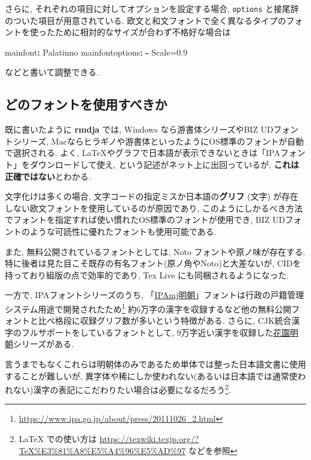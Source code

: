 \documentclass[
  xelatex,ja=standard,jafont=noto]{bxjsbook}
\newenvironment{Shaded}{\begin{snugshade}}{\end{snugshade}}
\newcommand{\AttributeTok}[1]{\textcolor[rgb]{0.77,0.63,0.00}{#1}}
\newcommand{\FunctionTok}[1]{\textcolor[rgb]{0.00,0.00,0.00}{#1}}
\newcommand{\KeywordTok}[1]{\textcolor[rgb]{0.13,0.29,0.53}{\textbf{#1}}}
\theoremstyle{definition}
\theoremstyle{definition}
\theoremstyle{definition}
\theoremstyle{definition}
\theoremstyle{remark}
\begin{document}
さらに, それぞれの項目に対してオプションを設定する場合, \texttt{options}
と接尾辞のついた項目が用意されている.
欧文と和文フォントで全く異なるタイプのフォントを使ったために相対的なサイズが合わず不格好な場合は

\begin{Shaded}
\begin{Highlighting}[]
\FunctionTok{mainfont}\KeywordTok{:}\AttributeTok{ Palatinno}
\FunctionTok{mainfontoptions}\KeywordTok{:}
\AttributeTok{  }\KeywordTok{{-}}\AttributeTok{ Scale=0.9}
\end{Highlighting}
\end{Shaded}

などと書いて調整できる.

\hypertarget{ux3069ux306eux30d5ux30a9ux30f3ux30c8ux3092ux4f7fux7528ux3059ux3079ux304dux304b}{%
\subsection{どのフォントを使用すべきか}\label{ux3069ux306eux30d5ux30a9ux30f3ux30c8ux3092ux4f7fux7528ux3059ux3079ux304dux304b}}

既に書いたように \textbf{rmdja} では, Windows なら游書体シリーズやBIZ
UDフォントシリーズ,
Macならヒラギノや游書体といったようにOS標準のフォントが自動で選択される.
よく,
LaTeXやグラフで日本語が表示できないときは「IPAフォント」をダウンロードして使え,
という記述がネット上に出回っているが,
\textbf{これは正確ではない}とわかる.

文字化けは多くの場合, 文字コードの指定ミスか日本語の\textbf{グリフ}
(文字) が存在しない欧文フォントを使用しているのが原因であり,
このようにしかるべき方法でフォントを指定すれば使い慣れたOS標準のフォントが使用でき,
BIZ UDフォントのような可読性に優れたフォントも使用可能である.

また, 無料公開されているフォントとしては, Noto
フォントや原ノ味が存在する.
特に後者は見た目こそ既存の有名フォント(原ノ角やNoto)と大差ないが,
CIDを持っており組版の点で効率的であり, Tex Live
にも同梱されるようになった.

一方で, IPAフォントシリーズのうち,
「\href{https://moji.or.jp/mojikiban/font/}{IPAmj明朝}」フォントは行政の戸籍管理システム用途で開発されたため\footnote{\url{https://www.ipa.go.jp/about/press/20111026_2.html}}
約6万字の漢字を収録するなど他の無料公開フォントと比べ格段に収録グリフ数が多いという特徴がある.
さらに, CJK統合漢字のフルサポートをしているフォントとして,
9万字近い漢字を収録した\href{http://fonts.jp/hanazono/}{花園明朝}シリーズがある.

言うまでもなくこれらは明朝体のみであるため単体では整った日本語文書に使用することが難しいが,
異字体や稀にしか使われない(あるいは日本語では通常使われない)漢字の表記にこだわりたい場合は必要になるだろう\footnote{LaTeX
  での使い方は
  \url{https://texwiki.texjp.org/?TeX\%E3\%81\%A8\%E5\%A4\%96\%E5\%AD\%97}
  などを参照}.
\end{document}
